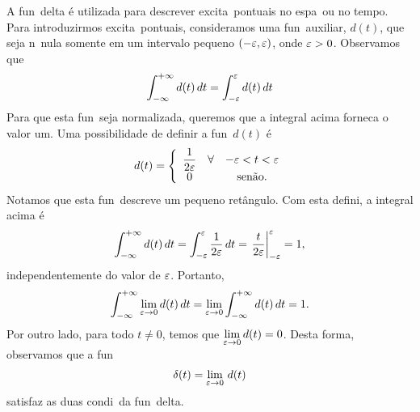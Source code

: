 A fun\cao\ delta \'e utilizada para descrever excita\coes\ pontuais no
espa\co\ ou no tempo. Para introduzirmos excita\coes\ pontuais,
consideramos uma fun\cao\ auxiliar, $d(t)$, que seja n\ao\ nula somente
em um intervalo pequeno $(-\varepsilon,\varepsilon)$, onde $\varepsilon > 0$.
Observamos que 
\begin{equation}
\int_{-\infty}^{+\infty} d(t) \, dt = 
\int_{-\varepsilon}^{\varepsilon} d(t) \, dt 
\label{eq:idt}
\end{equation}
Para que esta fun\cao\ seja normalizada, queremos que a integral acima
forneca o valor um. Uma possibilidade de definir a fun\cao\ $d(t)$ \'e
\begin{equation}
d(t) = \left\{ \begin{array}{ccc}
\displaystyle \frac{1}{2\varepsilon} & \forall & -\varepsilon < t <
\varepsilon \\
0 && \mbox{sen\~ao}.
\end{array}
\right.
\label{eq:dt}
\end{equation}
Notamos que esta fun\cao\ descreve um pequeno ret\^angulo.
Com esta defini\cao, a integral acima \'e
\begin{equation}
\int_{-\infty}^{+\infty} d(t) \, dt = 
\int_{-\varepsilon}^{\varepsilon} \frac{1}{2\varepsilon} \, dt =
\left.\frac{t}{2\varepsilon}\right|_{-\varepsilon}^{\varepsilon} = 1,
\label{eq:idtu}
\end{equation}
independentemente do valor de $\varepsilon$. Portanto,
\begin{equation}
\int_{-\infty}^{+\infty} \lim_{\varepsilon\to0} d(t) \, dt = 
\lim_{\varepsilon\to0} \int_{-\infty}^{+\infty} d(t) \, dt = 1.
\label{eq:idtl}
\end{equation}
Por outro lado, para todo $t\neq0$, temos que $\displaystyle
\lim_{\varepsilon\to0} d(t) = 0$. Desta forma, observamos que a fun\cao\
\begin{equation}
\delta(t) = \lim_{\varepsilon\to0} \, d(t)
\label{eq:defdel}
\end{equation}
satisfaz as duas condi\coes\ da fun\cao\ delta.

